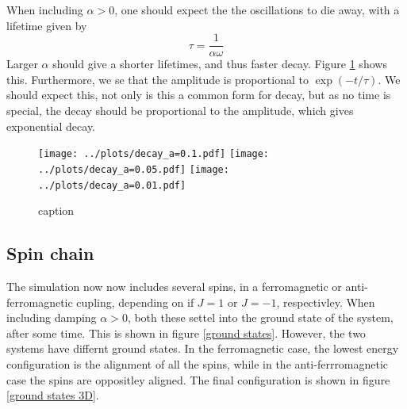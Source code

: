 \documentclass{article}
\begin{document}
    When including $\alpha > 0$, one should expect the the oscillations to die away, with a lifetime given by
    \begin{equation*}
        \tau = \frac{1}{\alpha \omega}
    \end{equation*}
    Larger $\alpha$ should give a shorter lifetimes, and thus faster decay. Figure \ref{decay} shows this. Furthermore, we se that the amplitude is proportional to $\exp(-t/\tau)$. We should expect this, not only is this a common form for decay, but as no time is special, the decay should be proportional to the amplitude, which gives exponential decay.

    \begin{figure}
        \centering
        \texttt{[image: ../plots/decay\_a=0.1.pdf]}
        \texttt{[image: ../plots/decay\_a=0.05.pdf]}
        \texttt{[image: ../plots/decay\_a=0.01.pdf]}
        \caption{caption}
        \label{decay}
    \end{figure}

    \subsection*{Spin chain}
    The simulation now now includes several spins, in a ferromagnetic or anti-ferromagnetic cupling, depending on if $J = 1$ or $J = -1$, respectivley. When including damping $\alpha > 0$, both these settel into the ground state of the system, after some time. This is shown in figure \ref{ground states}. However, the two systems have differnt ground states. In the ferromagnetic case, the lowest energy configuration is the alignment of all the spins, while in the anti-ferrromagnetic case the spins are oppositley aligned. The final configuration is shown in figure \ref{ground states 3D}.
\end{document}
